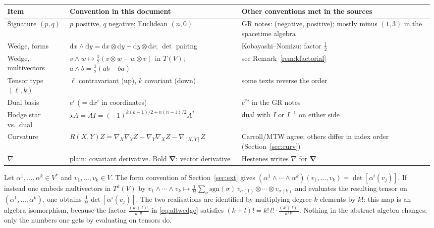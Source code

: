\documentclass[11pt,a4paper]{article}
\renewcommand{\arraystretch}{1.25}
\numberwithin{equation}{section}
\theoremstyle{definition}
\theoremstyle{plain}
\newcommand{\dd}{\mathrm{d}}
\newcommand{\sgn}{\mathrm{sgn}}
\newcommand{\rev}[1]{\widetilde{#1}}
\newcommand{\pss}{I}
\newcommand{\dual}[1]{#1^{\ast}}
\newcommand{\hodge}{\star}
\newcommand{\vd}{\boldsymbol{\nabla}}               %
\begin{document}
\begin{center}
\small
\renewcommand{\arraystretch}{1.3}
\begin{tabular}{@{}p{3.1cm}p{5.4cm}p{5.8cm}@{}}
\toprule
\textbf{Item} & \textbf{Convention in this document} & \textbf{Other conventions met in the sources}\\
\midrule
Signature $(p,q)$ & $p$ positive, $q$ negative; Euclidean $(n,0)$ & GR notes: (negative, positive); mostly minus $(1,3)$ in the spacetime algebra\\
Wedge, forms & $\dd x\wedge\dd y=\dd x\otimes\dd y-\dd y\otimes\dd x$; $\det$ pairing & Kobayashi--Nomizu: factor $\frac12$\\
Wedge, multivectors & $v\wedge w\mapsto\frac12(v\otimes w-w\otimes v)$ in $T(V)$; $a\wedge b=\frac12(ab-ba)$ & see Remark~\ref{rem:kfactorial}\\
Tensor type $(\ell,k)$ & $\ell$ contravariant (up), $k$ covariant (down) & some texts reverse the order\\
Dual basis & $e^i$ ($=\dd x^i$ in coordinates) & $e^{*i}$ in the GR notes\\
Hodge star vs.\ dual & $\hodge A=\rev A\pss=(-1)^{k(k-1)/2+n(n-1)/2}\dual A$ & dual with $\pss$ or $\pss^{-1}$ on either side\\
Curvature & $R(X,Y)Z=\nabla_X\nabla_YZ-\nabla_Y\nabla_XZ-\nabla_{[X,Y]}Z$ & Carroll/MTW agree; others differ in index order (Section~\ref{sec:curv})\\
$\nabla$ & plain: covariant derivative. Bold $\vd$: vector derivative & Hestenes writes $\nabla$ for $\vd$\\
\bottomrule
\end{tabular}
\end{center}

\begin{remark}\label{rem:kfactorial}
Let $\alpha^1,\dots,\alpha^k\in V^*$ and $v_1,\dots,v_k\in V$. The form convention of Section~\ref{sec:ext} gives $(\alpha^1\wedge\cdots\wedge\alpha^k)(v_1,\dots,v_k)=\det[\alpha^i(v_j)]$. If instead one embeds multivectors in $T^k(V)$ by
$v_1\wedge\cdots\wedge v_k\mapsto\frac1{k!}\sum_\sigma\sgn(\sigma)\,v_{\sigma(1)}\otimes\cdots\otimes v_{\sigma(k)}$ and evaluates the resulting tensor on $(\alpha^1,\dots,\alpha^k)$, one obtains $\frac1{k!}\det[\alpha^i(v_j)]$. The two realisations are identified by multiplying degree-$k$ elements by $k!$: this map is an algebra isomorphism, because the factor $\frac{(k+l)!}{k!\,l!}$ in \eqref{eq:altwedge} satisfies $(k+l)!=k!\,l!\cdot\frac{(k+l)!}{k!\,l!}$. Nothing in the abstract algebra changes; only the numbers one gets by evaluating on tensors do.
\end{remark}
\end{document}
